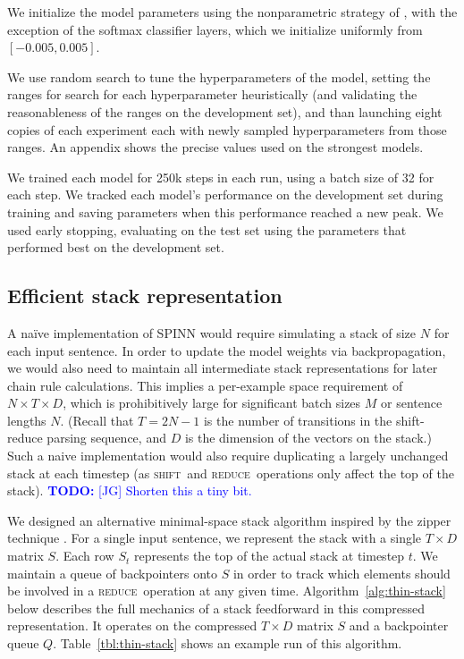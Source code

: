 \documentclass[11pt]{article}
\newcommand\todo[1]{\textcolor{blue}{\textbf{TODO:} #1}}
\newcommand{\shift}{\textsc{shift}}
\newcommand{\reduce}{\textsc{reduce}}
\begin{document}
We initialize the model parameters using the nonparametric strategy of \citet{DBLP:journals/corr/HeZR015}, with the exception of the softmax classifier layers, which we initialize uniformly from $[-0.005, 0.005]$.

We use random search to tune the hyperparameters of the model, setting the ranges for search for each hyperparameter heuristically (and validating the reasonableness of the ranges on the development set), and than launching eight copies of each experiment each with newly sampled hyperparameters from those ranges. An appendix shows the precise values used on the strongest models.

We trained each model for 250k steps in each run, using a batch size of 32 for each step. We tracked each model's performance on the development set during training and saving parameters when this performance reached a new peak. We used early stopping, evaluating on the test set using the parameters that performed best on the development set.

\subsection{Efficient stack representation}

A na\"ive implementation of SPINN would require simulating a stack of size $N$ for each input sentence. In order to update the model weights via backpropagation, we would also need to maintain all intermediate stack representations for later chain rule calculations. This implies a per-example space requirement of $N \times T \times D$, which is prohibitively large for significant batch sizes $M$ or sentence lengths $N$. (Recall that $T = 2N - 1$ is the number of transitions in the shift-reduce parsing sequence, and $D$ is the dimension of the vectors on the stack.) Such a naive implementation would also require duplicating a largely unchanged stack at each timestep (as \shift~and \reduce~operations only affect the top of the stack). \todo{[JG] Shorten this a tiny bit.}

We designed an alternative minimal-space stack algorithm inspired by the zipper technique \citep{huet1997zipper}. For a single input sentence, we represent the stack with a single $T \times D$ matrix $S$. Each row $S_t$ represents the top of the actual stack at timestep $t$. We maintain a queue of backpointers onto $S$ in order to track which elements should be involved in a \reduce~operation at any given time. Algorithm~\ref{alg:thin-stack} below describes the full mechanics of a stack feedforward in this compressed representation. It operates on the compressed $T \times D$ matrix $S$ and a backpointer queue $Q$. Table~\ref{tbl:thin-stack} shows an example run of this algorithm.
\end{document}
